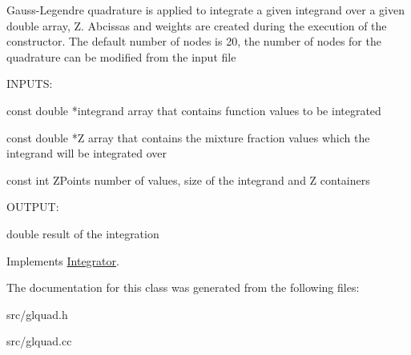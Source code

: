 Gauss-\/Legendre quadrature is applied to integrate a given integrand over a given double array, Z. Abcissas and weights are created during the execution of the constructor. The default number of nodes is 20, the number of nodes for the quadrature can be modified from the input file

\begin{DoxyVerb}
  INPUTS:

  const double *integrand            array that contains function values to be integrated

  const double *Z                    array that contains the mixture fraction values which the integrand will be integrated over

  const int ZPoints                  number of values, size of the integrand and Z containers
  
  OUTPUT:

  double                             result of the integration

  \end{DoxyVerb}
 

Implements \hyperlink{classIntegrator_a89fbef2f7923ce4e2c979b2ff1d1f4ac}{Integrator}.



The documentation for this class was generated from the following files:\begin{DoxyCompactItemize}
\item 
src/glquad.h\item 
src/glquad.cc\end{DoxyCompactItemize}
